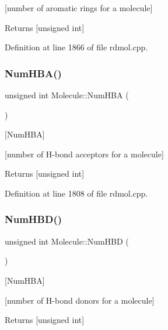 \mbox{[}number of aromatic rings for a molecule\mbox{]}

\begin{DoxyReturn}{Returns}
\mbox{[}unsigned int\mbox{]} 
\end{DoxyReturn}


Definition at line 1866 of file rdmol.\+cpp.

\mbox{\label{class_molecule_a932d2464d1d351fca8e72cd160bde74f}} 
\subsubsection{\texorpdfstring{Num\+H\+B\+A()}{NumHBA()}}
{\footnotesize\ttfamily unsigned int Molecule\+::\+Num\+H\+BA (\begin{DoxyParamCaption}{ }\end{DoxyParamCaption})}



\mbox{[}Num\+H\+BA\mbox{]} 

\mbox{[}number of H-\/bond acceptors for a molecule\mbox{]}

\begin{DoxyReturn}{Returns}
\mbox{[}unsigned int\mbox{]} 
\end{DoxyReturn}


Definition at line 1808 of file rdmol.\+cpp.

\mbox{\label{class_molecule_a67cebe5aa58856c930fa1b162e592956}} 
\subsubsection{\texorpdfstring{Num\+H\+B\+D()}{NumHBD()}}
{\footnotesize\ttfamily unsigned int Molecule\+::\+Num\+H\+BD (\begin{DoxyParamCaption}{ }\end{DoxyParamCaption})}



\mbox{[}Num\+H\+BA\mbox{]} 

\mbox{[}number of H-\/bond donors for a molecule\mbox{]}

\begin{DoxyReturn}{Returns}
\mbox{[}unsigned int\mbox{]} 
\end{DoxyReturn}


